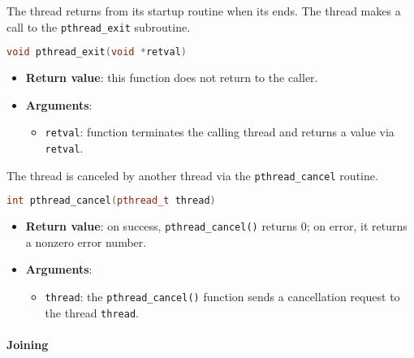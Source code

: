 The thread returns from its startup routine when its  ends. The thread makes a call to the \texttt{pthread\_exit} subroutine.
\begin{pthreadbox}
    \begin{lstlisting}[language=c++]
void pthread_exit(void *retval)\end{lstlisting}
\end{pthreadbox}
\begin{itemize}
    \item \textbf{Return value}: this function does not return to the caller.
    \item \textbf{Arguments}:
    \begin{itemize}
        \item \texttt{retval}: function terminates the calling thread and returns a value via \texttt{retval}.
    \end{itemize}
\end{itemize}

\highspace
The thread is canceled by another thread via the \texttt{pthread\_cancel} routine.
\begin{pthreadbox}
    \begin{lstlisting}[language=c++]
int pthread_cancel(pthread_t thread)\end{lstlisting}
\end{pthreadbox}
\begin{itemize}
    \item \textbf{Return value}: on success, \texttt{pthread\_cancel()} returns 0; on error, it returns a nonzero error number.
    \item \textbf{Arguments}:
    \begin{itemize}
        \item \texttt{thread}: the \texttt{pthread\_cancel()} function sends a cancellation request to the thread \texttt{thread}.
    \end{itemize}
\end{itemize}

\newpage

\paragraph{Joining}\label{paragraph: Joining}

